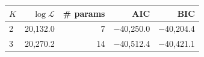 \begin{tabular}{lrrrr}
\toprule
$K$ & $\log\mathcal{L}$ & \# params & AIC & BIC \\
\midrule
2 & 20,132.0 & 7 & $-$40,250.0 & $-$40,204.4 \\
3 & 20,270.2 & 14 & $-$40,512.4 & $-$40,421.1 \\
\bottomrule
\end{tabular}
